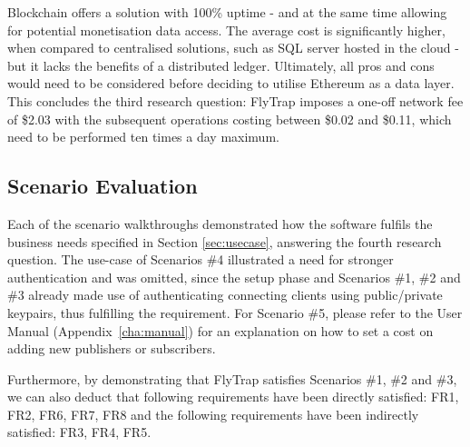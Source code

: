 Blockchain offers a solution with 100\% uptime - and at the same time allowing for potential monetisation data access. The average cost is significantly higher, when compared to centralised solutions, such as SQL server hosted in the cloud - but it lacks the benefits of a distributed ledger. Ultimately, all pros and cons would need to be considered before deciding to utilise Ethereum as a data layer. This concludes the third research question: FlyTrap imposes a one-off network fee of \$2.03 with the subsequent operations costing between \$0.02 and \$0.11, which need to be performed ten times a day maximum.
\subsection{Scenario Evaluation}
Each of the scenario walkthroughs demonstrated how the software fulfils the business needs specified in Section \ref{sec:usecase}, answering the fourth research question. The use-case of Scenarios \#4 illustrated a need for stronger authentication and was omitted, since the setup phase and Scenarios \#1, \#2 and \#3 already made use of authenticating connecting clients using public/private keypairs, thus fulfilling the requirement. For Scenario \#5, please refer to the User Manual (Appendix~\ref{cha:manual}) for an explanation on how to set a cost on adding new publishers or subscribers.

Furthermore, by demonstrating that FlyTrap satisfies Scenarios \#1, \#2 and \#3, we can also deduct that following requirements have been directly satisfied: FR1, FR2, FR6, FR7, FR8 and the following requirements have been indirectly satisfied: FR3, FR4, FR5. 
